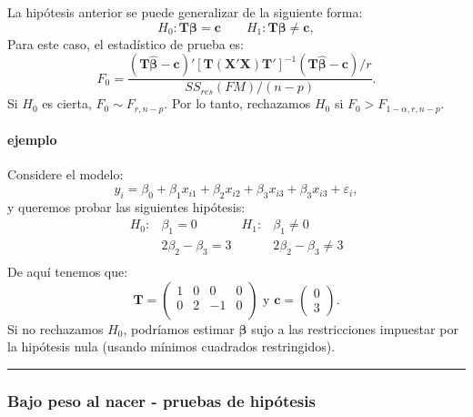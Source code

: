 \documentclass[
]{article}
\begin{document}
La hipótesis anterior se puede generalizar de la siguiente forma:
\begin{equation}
H_{0}: \boldsymbol T\boldsymbol \beta=\boldsymbol c\qquad H_{1}: \boldsymbol T\boldsymbol \beta\neq \boldsymbol c,
\label{eq:hipGeneral2}
\end{equation}
Para este caso, el estadístico de prueba es:
\[
F_{0} = \frac{(\boldsymbol T\widehat{\boldsymbol \beta}-\boldsymbol c)'[\boldsymbol T(\boldsymbol X'\boldsymbol X)\boldsymbol T']^{-1}(\boldsymbol T\widehat{\boldsymbol \beta}-\boldsymbol c)/r}{SS_{res}(FM)/(n-p)}.
\]
Si \(H_{0}\) es cierta, \(F_{0}\sim F_{r,n-p}\). Por lo tanto, rechazamos \(H_{0}\) si \(F_{0} > F_{1-\alpha,r,n-p}\).

\hypertarget{ejemplo-1}{%
\paragraph*{ejemplo}\label{ejemplo-1}}

Considere el modelo:
\[
y_{i} = \beta_{0} + \beta_{1}x_{i1}+ \beta_{2}x_{i2}+ \beta_{3}x_{i3}+ \beta_{3}x_{i3} + \varepsilon_{i},
\]
y queremos probar las siguientes hipótesis:
\begin{align*}
H_{0}:& \beta_{1}=0 & H_{1}:&\beta_{1}\neq 0 \\
      & 2\beta_{2}-\beta_{3}=3 & &2\beta_{2}-\beta_{3}\neq 3 \\
\end{align*}
De aquí tenemos que:
\[
\boldsymbol T= \begin{pmatrix}
1 & 0 & 0 & 0 \\
0 & 2 & -1 & 0 \\
\end{pmatrix} \mbox{ y } \boldsymbol c= \begin{pmatrix} 0 \\ 3  \end{pmatrix}.
\]
Si no rechazamos \(H_{0}\), podríamos estimar \(\boldsymbol \beta\) sujo a las restricciones impuestar por la hipótesis nula (usando mínimos cuadrados restringidos).

\rule{\textwidth}{0.4pt}

\hypertarget{bajo-peso-al-nacer---pruebas-de-hipuxf3tesis}{%
\subsubsection*{Bajo peso al nacer - pruebas de hipótesis}\label{bajo-peso-al-nacer---pruebas-de-hipuxf3tesis}}
\end{document}
